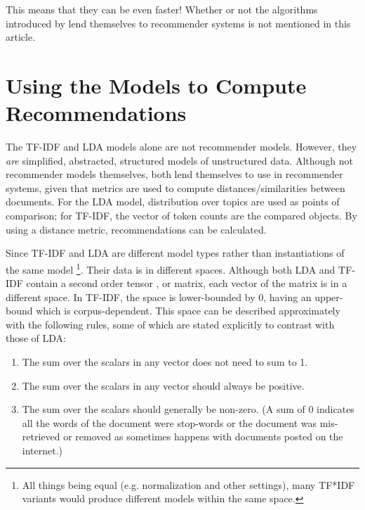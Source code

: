 This means that they can be even faster! Whether or not the algorithms introduced by \citeauthor{arora2013practical} lend themselves to recommender systems is not mentioned in this article.

\section{Using the Models to Compute Recommendations}
The TF-IDF and LDA models alone are not recommender models. However, they \textit{are} simplified, abstracted, structured models of unstructured data. Although not recommender models themselves, both lend themselves to use in recommender systems, given that metrics are used to compute distances/similarities between documents. For the LDA model, distribution over topics are used as points of comparison; for TF-IDF, the vector of token counts are the compared objects. By using a distance metric, recommendations can be calculated. %

Since TF-IDF and LDA are different model types rather than instantiations of the same model \footnote{All things being equal (e.g. normalization and other settings), many TF*IDF variants would produce different models within the same space.}. Their data is in different spaces. Although both LDA and TF-IDF contain a second order tensor \citep{turney2010frequency}, or matrix, each vector of the matrix is in a different space. In TF-IDF, the space is lower-bounded by 0, having an upper-bound which is corpus-dependent. This space can be described approximately with the following rules, some of which are stated explicitly to contrast with those of LDA:

\begin{enumerate}
    \item The sum over the scalars in any vector does not need to sum to 1.
    \item The sum over the scalars in any vector should always be positive.
    \item The sum over the scalars should generally be non-zero. (A sum of 0 indicates all the words of the document were stop-words or the document was mis-retrieved or removed as sometimes happens with documents posted on the internet.)
\end{enumerate}

